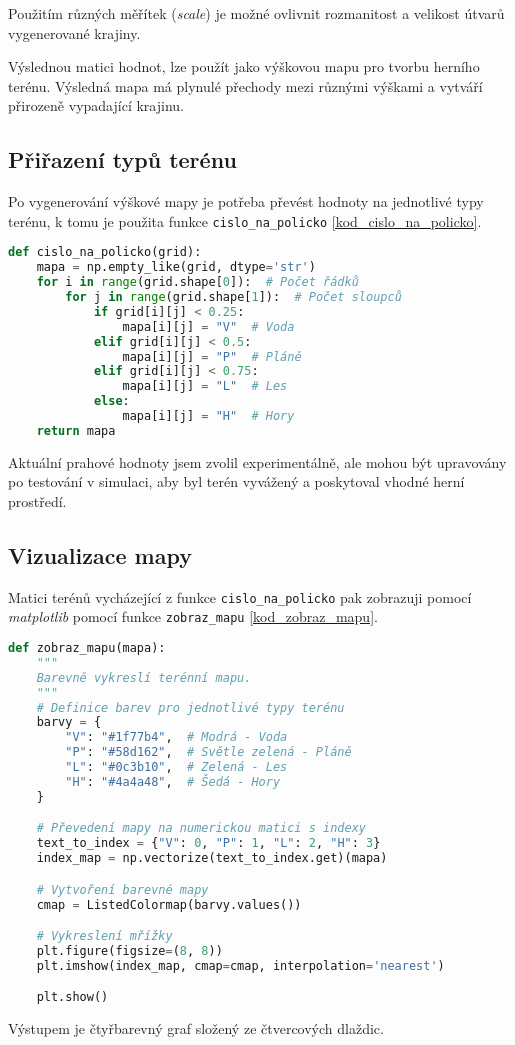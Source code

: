 Použitím různých měřítek (\textit{scale}) je možné ovlivnit rozmanitost a velikost útvarů vygenerované krajiny.

Výslednou matici hodnot, lze použít jako výškovou mapu pro tvorbu herního terénu. Výsledná mapa má plynulé přechody mezi různými výškami a vytváří přirozeně vypadající krajinu.

\subsection{Přiřazení typů terénu}

Po vygenerování výškové mapy je potřeba převést hodnoty na jednotlivé typy terénu, k tomu je použita funkce \texttt{cislo\_na\_policko} \ref{kod_cislo_na_policko}. 

\begin{lstlisting}[language=Python, caption=Převádějící výškovou mapu na konkrétní terény, label=kod_cislo_na_policko]
def cislo_na_policko(grid):
    mapa = np.empty_like(grid, dtype='str')
    for i in range(grid.shape[0]):  # Počet řádků
        for j in range(grid.shape[1]):  # Počet sloupců
            if grid[i][j] < 0.25:
                mapa[i][j] = "V"  # Voda
            elif grid[i][j] < 0.5:
                mapa[i][j] = "P"  # Pláně
            elif grid[i][j] < 0.75:
                mapa[i][j] = "L"  # Les
            else:
                mapa[i][j] = "H"  # Hory
    return mapa

\end{lstlisting}

Aktuální prahové hodnoty jsem zvolil experimentálně, ale mohou být upravovány po testování v simulaci, aby byl terén vyvážený a poskytoval vhodné herní prostředí.

\subsection{Vizualizace mapy}

Matici terénů vycházející z funkce \texttt{cislo\_na\_policko} pak zobrazuji pomocí \textit{matplotlib} pomocí funkce \texttt{zobraz\_mapu} \ref{kod_zobraz_mapu}.

\begin{lstlisting}[language=Python, caption=Kód generující pole pro náhodnou mapu, label=kod_zobraz_mapu]
def zobraz_mapu(mapa):
    """
    Barevně vykreslí terénní mapu.
    """
    # Definice barev pro jednotlivé typy terénu
    barvy = {
        "V": "#1f77b4",  # Modrá - Voda
        "P": "#58d162",  # Světle zelená - Pláně
        "L": "#0c3b10",  # Zelená - Les
        "H": "#4a4a48",  # Šedá - Hory
    }

    # Převedení mapy na numerickou matici s indexy
    text_to_index = {"V": 0, "P": 1, "L": 2, "H": 3}
    index_map = np.vectorize(text_to_index.get)(mapa)

    # Vytvoření barevné mapy
    cmap = ListedColormap(barvy.values())

    # Vykreslení mřížky
    plt.figure(figsize=(8, 8))
    plt.imshow(index_map, cmap=cmap, interpolation='nearest')

    plt.show()

\end{lstlisting}

Výstupem je čtyřbarevný graf složený ze čtvercových dlaždic.

